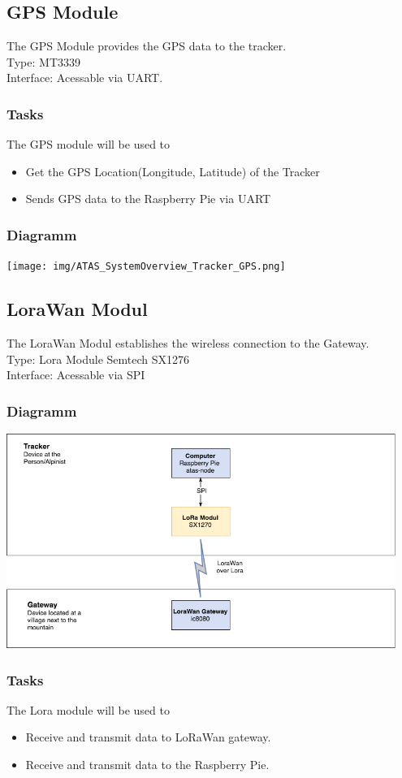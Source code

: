 \documentclass[a4paper,11pt, oneside]{report}
\theoremstyle{definition}
\begin{document}
\subsection{GPS Module}
The GPS Module provides the GPS data to the tracker.\\[0.3cm]
Type: MT3339\\
Interface:  Acessable via UART.
\subsubsection{Tasks}
The GPS module will be used to
\begin{itemize}
\item Get the GPS Location(Longitude, Latitude) of the Tracker
\item Sends GPS data to the Raspberry Pie via UART
\end{itemize}
\subsubsection{Diagramm}
\texttt{[image: img/ATAS\_SystemOverview\_Tracker\_GPS.png]}

\subsection{LoraWan Modul}
The LoraWan Modul establishes the wireless connection to the Gateway.\\[0.3cm]
Type: Lora Module Semtech SX1276\\
Interface: Acessable via SPI
\subsubsection{Diagramm}
\includegraphics[width=0.95\textwidth]{img/ATAS_SystemOverview_Detail_LoRaWan.png}

\subsubsection{Tasks}
The Lora module will be used to
\begin{itemize}
\item Receive and transmit data to LoRaWan gateway.
\item Receive and transmit data to the Raspberry Pie.
\end{itemize}
\end{document}
